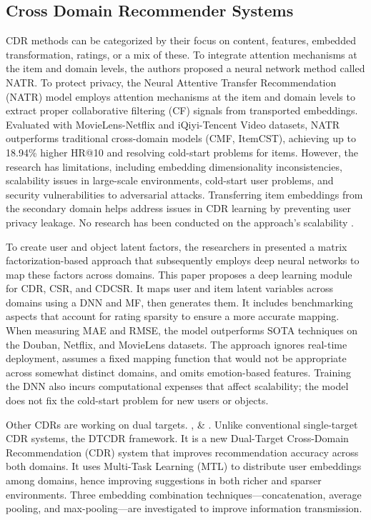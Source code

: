 \subsection{Cross Domain Recommender Systems}
CDR methods can be categorized by their focus on content, features, embedded transformation, ratings, or a mix of these. To integrate attention mechanisms at the item and domain levels, the authors proposed a neural network method called NATR.  To protect privacy, the Neural Attentive Transfer Recommendation (NATR) model employs attention mechanisms at the item and domain levels to extract proper collaborative filtering (CF) signals from transported embeddings. Evaluated with MovieLens-Netflix and iQiyi-Tencent Video datasets, NATR outperforms traditional cross-domain models (CMF, ItemCST), achieving up to 18.94\% higher HR@10 and resolving cold-start problems for items. However, the research has limitations, including embedding dimensionality inconsistencies, scalability issues in large-scale environments, cold-start user problems, and security vulnerabilities to adversarial attacks. Transferring item embeddings from the secondary domain helps address issues in CDR learning by preventing user privacy leakage. No research has been conducted on the approach's scalability  \cite{ref37}.

To create user and object latent factors, the researchers in  \cite{ref38} presented a matrix factorization-based approach that subsequently employs deep neural networks to map these factors across domains. This paper proposes a deep learning module for CDR, CSR, and CDCSR. It maps user and item latent variables across domains using a DNN and MF, then generates them. It includes benchmarking aspects that account for rating sparsity to ensure a more accurate mapping.   When measuring MAE and RMSE, the model outperforms SOTA techniques on the Douban, Netflix, and MovieLens datasets.   The approach ignores real-time deployment, assumes a fixed mapping function that would not be appropriate across somewhat distinct domains, and omits emotion-based features.   Training the DNN also incurs computational expenses that affect scalability; the model does not fix the cold-start problem for new users or objects.

Other CDRs are working on dual targets. \cite{ref39}, \cite{ref40}  \& \cite{ref41}  . Unlike conventional single-target CDR systems, the DTCDR framework.\cite{ref39} It is a new Dual-Target Cross-Domain Recommendation (CDR) system that improves recommendation accuracy across both domains. It uses Multi-Task Learning (MTL) to distribute user embeddings among domains, hence improving suggestions in both richer and sparser environments. Three embedding combination techniques---concatenation, average pooling, and max-pooling---are investigated to improve information transmission.

